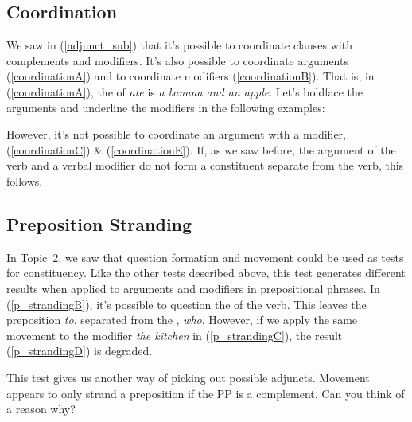 \documentclass{article}
\begin{document}
\subsection{Coordination}
We saw in (\ref{adjunct_sub}) that it's possible to coordinate clauses with complements and modifiers.
It's also possible to coordinate arguments (\ref{coordinationA}) and to coordinate modifiers (\ref{coordinationB}).
That is, in (\ref{coordinationA}), the  of \emph{ate} is \emph{a banana and an apple}. Let's boldface the arguments and underline the modifiers in the following examples:
\begin{exe}
    \label{coordination}
\end{exe}
However, it's not possible to coordinate an argument with a modifier, (\ref{coordinationC}) \& (\ref{coordinationE}).
If, as we saw before, the argument of the verb and a verbal modifier do not form a constituent separate from the verb, this follows.

\subsection{Preposition Stranding}
In Topic~2, we saw that question formation and movement could be used as tests for constituency.
Like the other tests described above, this test generates different results when applied to arguments and modifiers in prepositional phrases.
In (\ref{p_strandingB}), it's possible to question the  of the verb.
This leaves the preposition \emph{to}, separated from the , \emph{who}.
However, if we apply the same movement to the modifier \emph{the kitchen} in (\ref{p_strandingC}), the result (\ref{p_strandingD}) is degraded.
\begin{exe}
    \label{p_stranding}
\end{exe}
This  test gives us another way of picking out possible adjuncts.
Movement appears to only strand a preposition if the PP is a complement. Can you think of a reason why?
\end{document}
